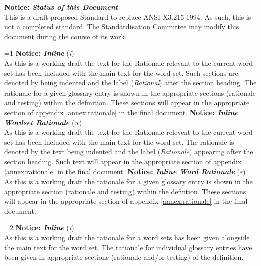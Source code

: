 \begin{titlepage}
\textbf{Notice: \emph{Status of this Document}} \\
This is a draft proposed Standard to replace ANSI X3.215-1994. As
such, this is not a completed standard. The Standardisation Committee
may modify this document during the course of its work.


%
%

\ifnum\value{part}=1
	\ifinlineintro
		\ifinlinebody
\textbf{Notice: \emph{Inline}} (\textit{i}) \\
As this is a working draft the text for the Rationale relevant to
the current word set has been included with the main text for the
word set.
Such sections are denoted by being indented and the label
(\emph{Rational}) after the section heading.
The rationale for a given glossary entry is shown in the appropriate
sections (rationale and testing) within the definition.
These sections will appear in the appropriate section of appendix
\ref{annex:rationale} in the final document.
		\else
\textbf{Notice: \emph{Inline Wordset Rationale}} (\textit{w}) \\
As this is a working draft the text for the Rationale relevent to
the current word set has been included with the main text for the
word set. The rationale is denoted by the text being indented and the
label (\emph{Rationale}) appearing after the section heading. Such
text will appear in the appropriate section of appendix
\ref{annex:rationale} in the final document.
		\fi
	\else
		\ifinlinebody
\textbf{Notice: \emph{Inline Word Rationale}} (\textit{r}) \\
As this is a working draft the rationale for a given glossary entry
is shown in the appropriate section (rationale and testing) within the
defintion.
These sections will appear in the appropriate section of appendix
\ref{annex:rationale} in the final document.
		\fi
	\fi
\fi


%
%

\ifnum\value{part}=2
	\ifinlineintro
		\ifinlinebody
\textbf{Notice: \emph{Inline}} (\textit{i}) \\
As this is a working draft the rationale for a word sets has been given
alongside the main text for the word set. The rationale for individual
glossary entries have been given in appropriate sections (rationale
and/or testing) of the definition.


\end{titlepage}

